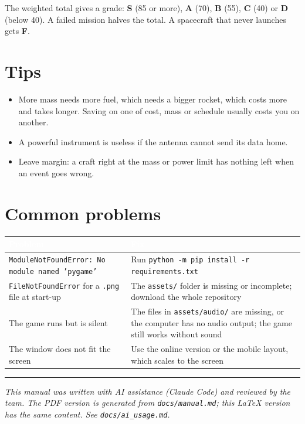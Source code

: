 \documentclass[11pt,a4paper]{article}
\newcommand{\hd}[1]{\textcolor{white}{\textbf{#1}}}   %
\begin{document}
The weighted total gives a grade: \textbf{S} (85 or more), \textbf{A} (70),
\textbf{B} (55), \textbf{C} (40) or \textbf{D} (below 40). A failed mission
halves the total. A spacecraft that never launches gets \textbf{F}.

\section{Tips}

\begin{itemize}[leftmargin=*]
  \item More mass needs more fuel, which needs a bigger rocket, which costs
        more and takes longer. Saving on one of cost, mass or schedule usually
        costs you on another.
  \item A powerful instrument is useless if the antenna cannot send its data
        home.
  \item Leave margin: a craft right at the mass or power limit has nothing left
        when an event goes wrong.
\end{itemize}

\section{Common problems}

\begin{tabularx}{\textwidth}{@{}LL@{}}
\toprule
{}\hd{Problem} & \hd{Fix} \\
\midrule
\texttt{ModuleNotFoundError: No module named 'pygame'} & Run \texttt{python -m pip install -r requirements.txt} \\
\texttt{FileNotFoundError} for a \texttt{.png} file at start-up & The \texttt{assets/} folder is missing or incomplete; download the whole repository \\
The game runs but is silent & The files in \texttt{assets/audio/} are missing, or the computer has no audio output; the game still works without sound \\
The window does not fit the screen & Use the online version or the mobile layout, which scales to the screen \\
\bottomrule
\end{tabularx}

\vfill
\noindent\rule{\textwidth}{0.4pt}

{\small\itshape This manual was written with AI assistance (Claude Code) and
reviewed by the team. The PDF version is generated from
\texttt{docs/manual.md}; this LaTeX version has the same content. See
\texttt{docs/ai\_usage.md}.}
\end{document}

